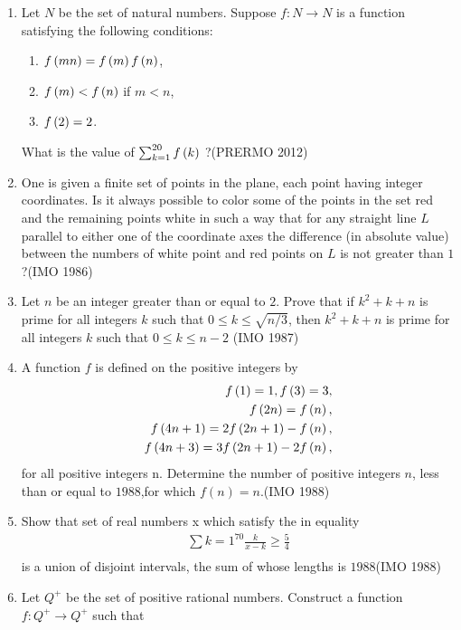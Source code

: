 \begin{enumerate}
\item Let $N$ be the set of natural numbers. Suppose $f : N \rightarrow N$ is a function satisfying the following conditions:
    \begin{enumerate}
	    \item $f\left(mn\right) = f\left(m\right) f\left(n\right)$,
	    \item $f\left(m\right) < f\left(n\right)$ if $m < n$,
	    \item $f\left(2\right) = 2$.
    \end{enumerate}
	What is the value of $\sum_{k=1}^{20} f\left(k\right)$ ?\hfill(PRERMO 2012)
	\item One is given a finite set of points in the plane, each point having integer coordinates. Is it always possible to color some of the points in the set red and the remaining points white in such a way that for any straight line $L$ parallel to either one of the coordinate axes the difference (in absolute value) between the numbers of white point and red points on $L$ is not greater than $1$?\hfill(IMO 1986)
\item Let $n$ be an integer greater than or equal to $2$. Prove that if $k^2+k+n$ is prime for all integers $k$ such that $0\leq k\leq \sqrt{n/3}$, then $k^2+k+n$ is prime for all integers $k$ such that $0\leq k\leq n-2$ \hfill(IMO 1987)
	\item A function $f$ is defined on the positive integers by
                  \begin{align*}
  f\left(1\right)=1, f\left(3\right)=3, \\
  f\left(2n\right)=f\left(n\right), \\
                  f\left(4n+1\right)=2f\left(2n+1\right)-f\left(n\right),\\
                  f\left(4n+3\right)=3f\left(2n+1\right)-2f\left(n\right),\\ \end{align*}
                  for all positive integers n.
                  Determine the number of positive integers $n$, less than or equal to $1988$,for which $f(n) = n$.\hfill(IMO 1988)
                  \item Show that set of real numbers x which satisfy the in equality                                                                \begin{align*}\sum{k=1}^{70}\frac{k}{x-k}\geq \frac{5}{4}\\ \end{align*}                                                          is a union of disjoint intervals, the sum of whose lengths is $1988$\hfill(IMO 1988)
\item Let $Q^+$ be the set of positive rational numbers. Construct a function $ f: Q^+ \rightarrow Q^+$ such that 


\end{enumerate}
